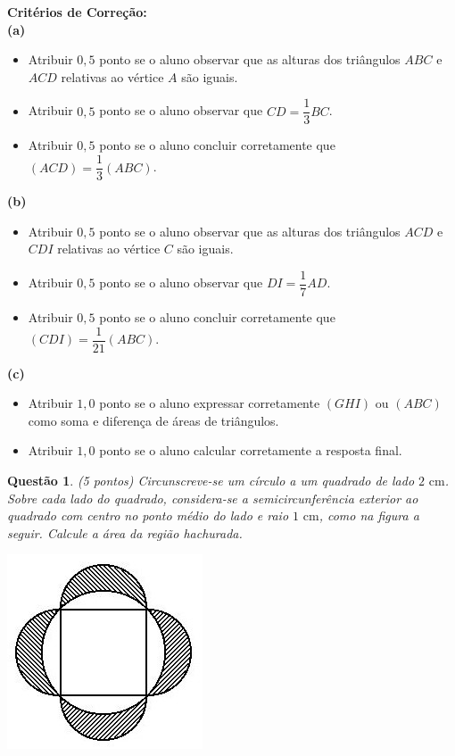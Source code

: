 \documentclass[oneside,a4paper,12pt]{article}
\theoremstyle{Colorido}
\theoremstyle{solu}
\theoremstyle{dotlessP}
\newtheorem{sol}{Questão}
\begin{document}
\begin{mdframed}
\textbf{Critérios de Correção:} \\
\textbf{(a)} 
\begin{itemize}
    \item Atribuir $0,5$ ponto se o aluno observar que as alturas dos triângulos $ABC$ e $ACD$ relativas ao vértice $A$ são iguais.
    \item Atribuir $0,5$ ponto se o aluno observar que $CD=\dfrac{1}{3}BC$.
    \item Atribuir $0,5$ ponto se o aluno concluir corretamente que $(ACD)=\dfrac{1}{3}(ABC)$.
\end{itemize}
\textbf{(b)} 
\begin{itemize}
    \item Atribuir $0,5$ ponto se o aluno observar que as alturas dos triângulos $ACD$ e $CDI$ relativas ao vértice $C$ são iguais.
    \item Atribuir $0,5$ ponto se o aluno observar que $DI=\dfrac{1}{7}AD$.
    \item Atribuir $0,5$ ponto se o aluno concluir corretamente que $(CDI)=\dfrac{1}{21}(ABC)$.
\end{itemize}
\textbf{(c)} 
\begin{itemize}
    \item Atribuir $1,0$ ponto se o aluno expressar corretamente $(GHI)$ ou $(ABC)$ como soma e diferença de áreas de triângulos.
    \item Atribuir $1,0$ ponto se o aluno calcular corretamente a resposta final.
\end{itemize}
\end{mdframed}
\newpage
	\begin{sol}
\textit{(5 pontos)} \newline \newline
Circunscreve-se um círculo a um quadrado de lado $2\mbox{ cm}$. Sobre cada lado do quadrado, considera-se a semicircunferência exterior ao quadrado com centro no ponto médio do lado e raio $1\mbox{ cm}$, como na figura a seguir. Calcule a área da região hachurada.
\begin{center}
\includegraphics[scale=1.0]{Provas e Avaliações/Figuras avaliações/16avaliacaociclo3.png}
\end{center}
\end{sol}
\end{document}
